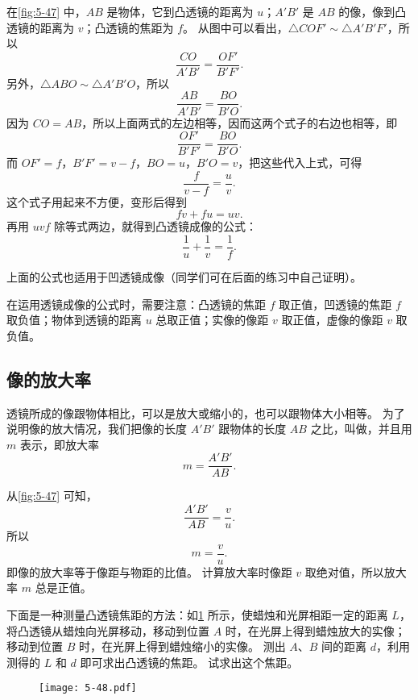 在\cref{fig:5-47} 中，$AB$ 是物体，它到凸透镜的距离为 $u$；$A'B'$ 是 $AB$ 的像，像到凸透镜的距离为 $v$；凸透镜的焦距为 $f$。
从图中可以看出，$\triangle COF' \sim \triangle A'B'F'$，所以
\[\frac{CO}{A'B'}=\frac{OF'}{B'F'}.  \]
另外，$\triangle ABO \sim \triangle A'B'O$，所以
\[\frac{AB}{A'B'}=\frac{BO}{B'O}. \]
因为 $CO=AB$，所以上面两式的左边相等，因而这两个式子的右边也相等，即
\[\frac{OF'}{B'F'}=\frac{BO}{B'O}. \]
而 $OF'=f$，$B'F'=v-f$，$BO=u$，$B'O=v$，把这些代入上式，可得
\[\frac{f}{v-f}=\frac{u}{v}. \]
这个式子用起来不方便，变形后得到
\[fv+fu=uv. \]
再用 $uvf$ 除等式两边，就得到凸透镜成像的公式：
\[\frac{1}{u}+\frac{1}{v}=\frac{1}{f}.\]

上面的公式也适用于凹透镜成像（同学们可在后面的练习中自己证明）。

在运用透镜成像的公式时，需要注意：凸透镜的焦距 $f$ 取正值，凹透镜的焦距 $f$ 取负值；物体到透镜的距离 $u$ 总取正值；实像的像距 $v$ 取正值，虚像的像距 $v$ 取负值。

\subsection{像的放大率}
透镜所成的像跟物体相比，可以是放大或缩小的，也可以跟物体大小相等。
为了说明像的放大情况，我们把像的长度 $A'B'$ 跟物体的长度 $AB$ 之比，叫做，并且用 $m$ 表示，即放大率
\[m=\frac{A'B'}{AB}.\]

从\cref{fig:5-47} 可知，
\[\frac{A'B'}{AB}=\frac{v}{u}.\]
所以
\[m=\frac{v}{u}.\]
即像的放大率等于像距与物距的比值。
计算放大率时像距 $v$ 取绝对值，所以放大率 $m$ 总是正值。

\begin{example}\label{exp:5-2}
下面是一种测量凸透镜焦距的方法：如\cref{fig:5-48} 所示，使蜡烛和光屏相距一定的距离 $L$，将凸透镜从蜡烛向光屏移动，移动到位置 $A$ 时，在光屏上得到蜡烛放大的实像；移动到位置 $B$ 时，在光屏上得到蜡烛缩小的实像。
测出 $A$、$B$ 间的距离 $d$，利用测得的 $L$ 和 $d$ 即可求出凸透镜的焦距。
试求出这个焦距。
\end{example}

\begin{figure}
  \texttt{[image: 5-48.pdf]}
	\caption{}\label{fig:5-48}
\end{figure}

